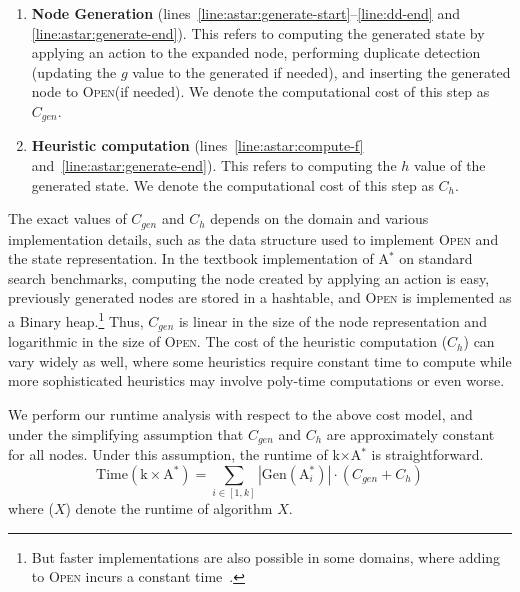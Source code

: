 \documentclass[smallextended]{svjour3}       %
\newcommand{\astar}{A$^*$\xspace}
\newcommand{\kxastar}{k$\times$A$^*$\xspace}
\newcommand{\astari}[1]{A$^*_{#1}$\xspace}
\newcommand{\Gen}{\text{Gen}}
\newcommand{\Time}{\text{Time}}
\newcommand{\open}{\textsc{Open}\xspace}
\begin{document}
\begin{enumerate}
  \item \textbf{Node Generation}  (lines~\ref{line:astar:generate-start}--\ref{line:dd-end} and \ref{line:astar:generate-end}).
  This refers to computing the generated state by applying an action to the expanded node, performing duplicate detection (updating the $g$ value to the generated if needed), and inserting the generated node to \open (if needed).
  We denote the computational cost of this step as $C_{gen}$.

  \item \textbf{Heuristic computation}  (lines~\ref{line:astar:compute-f} and~\ref{line:astar:generate-end}).
  This refers to computing the $h$ value of the generated state.
  We denote the computational cost of this step as $C_{h}$.
\end{enumerate}

The exact values of $C_{gen}$ and $C_h$ depends on the domain and various implementation details, such as the data structure used to implement \open and the state representation.
In the textbook implementation of \astar on standard search benchmarks, computing the node created by applying an action is easy, previously generated nodes are stored in a hashtable,
and \open is implemented as a Binary heap.\footnote{But faster implementations are also possible in some domains, where adding to \open incurs a constant time~\cite{GILON2016,BurnsHLR12}.}  
Thus, $C_{gen}$ is linear in the size of the node representation
and logarithmic in the size of \open. The cost of the heuristic computation ($C_h$) can vary widely as well, where some heuristics require constant time to compute while more sophisticated heuristics may involve poly-time computations or even worse.



We perform our runtime analysis with respect to the above cost model, and under the simplifying assumption that $C_{gen}$ and $C_h$ are approximately constant for all nodes.
Under this assumption, the runtime of \kxastar is straightforward.
\begin{equation}
\Time(\text{\kxastar}) = \sum_{i\in[1,k]} |\Gen(\text{\astari{i}})|\cdot (C_{gen}+C_h)    
\end{equation}
where \Time($X$) denote the runtime of algorithm $X$.
\end{document}
